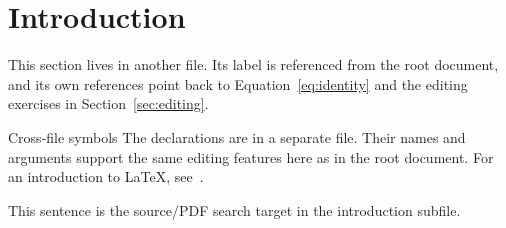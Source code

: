 \section{Introduction}
\label{sec:intro}

This section lives in another file. Its label is referenced from the root
document, and its own references point back to Equation~\eqref{eq:identity}
and the editing exercises in Section~\ref{sec:editing}.


\begin{demopanel}{Cross-file symbols}
  The declarations are in a separate file.
  Their names and arguments support the same editing features here as in
  the root document. For an introduction to LaTeX, see~\cite{lamport1994}.
\end{demopanel}

This sentence is the source/PDF search target in the introduction subfile.
